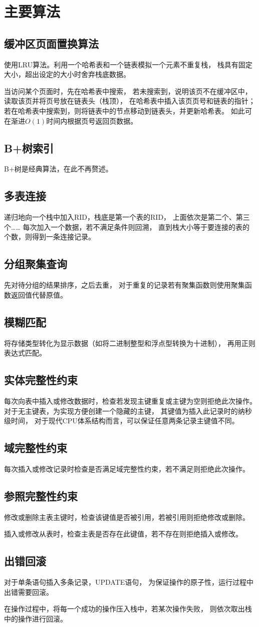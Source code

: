 \section{主要算法}
    \subsection{缓冲区页面置换算法}
        使用LRU算法。利用一个哈希表和一个链表模拟一个元素不重复栈，%
        栈具有固定大小，超出设定的大小时舍弃栈底数据。

        当访问某个页面时，先在哈希表中搜索，%
        若未搜索到，说明该页不在缓冲区中，读取该页并将页号放在链表头（栈顶），%
        在哈希表中插入该页页号和链表的指针；%
        若在哈希表中搜索到，则将链表中的节点移动到链表头，并更新哈希表。%
        如此可在渐进$O(1)$时间内根据页号返回页数据。
    \subsection{B+树索引}
        B+树是经典算法，在此不再赘述。
    \subsection{多表连接}
        递归地向一个栈中加入RID，栈底是第一个表的RID，%
        上面依次是第二个、第三个\dots\dots%
        每次加入一个数据，若不满足条件则回溯，%
        直到栈大小等于要连接的表的个数，则得到一条连接记录。
    \subsection{分组聚集查询}
        先对待分组的结果排序，之后去重，%
        对于重复的记录若有聚集函数则使用聚集函数返回值代替原值。
    \subsection{模糊匹配}
        将存储类型转化为显示数据（如将二进制整型和浮点型转换为十进制），%
        再用正则表达式匹配。
    \subsection{实体完整性约束}
        每次向表中插入或修改数据时，检查若发现主键重复或主键为空则拒绝此次操作。%
        对于无主键表，为实现方便创建一个隐藏的主键，%
        其键值为插入此记录时的纳秒级时间，%
        对于现代CPU体系结构而言，可以保证任意两条记录主键值不同。
    \subsection{域完整性约束}
        每次插入或修改记录时检查是否满足域完整性约束，若不满足则拒绝此次操作。
    \subsection{参照完整性约束}
        修改或删除主表主键时，检查该键值是否被引用，若被引用则拒绝修改或删除。

        插入或修改从表时，检查主表是否存在此键值，若不存在则拒绝插入或修改。
    \subsection{出错回滚}
        对于单条语句插入多条记录，UPDATE语句，%
        为保证操作的原子性，运行过程中出错需要回滚。%
        
        在操作过程中，将每一个成功的操作压入栈中，若某次操作失败，%
        则依次取出栈中的操作进行回滚。

